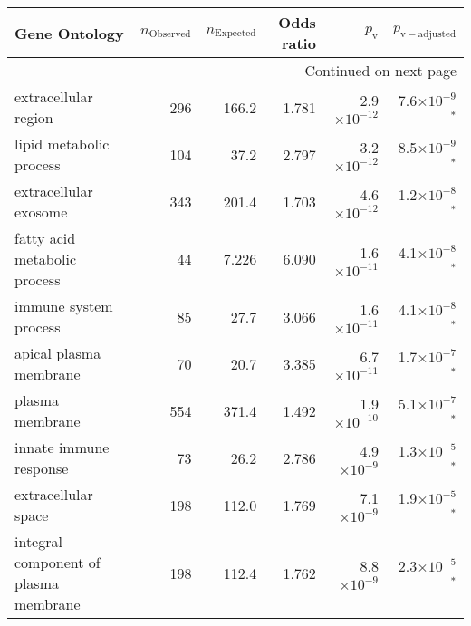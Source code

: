 \begin{longtable}{|l|r|r|r|r|r|}
\toprule
                                     Gene Ontology & $n_{\mathrm{Observed}}$ & $n_{\mathrm{Expected}}$ & Odds ratio &     $p_{\mathrm{v}}$ &     $p_{\mathrm{v-adjusted}}$ \\
\midrule
\endhead
\midrule
\multicolumn{6}{r}{{Continued on next page}} \\
\midrule
\endfoot

\bottomrule
\endlastfoot
                              extracellular region &                     296 &                   166.2 &      1.781 & 2.9$\times 10^{-12}$ &  7.6$\times 10^{-9}$$\bm{^*}$ \\
                           lipid metabolic process &                     104 &                    37.2 &      2.797 & 3.2$\times 10^{-12}$ &  8.5$\times 10^{-9}$$\bm{^*}$ \\
                             extracellular exosome &                     343 &                   201.4 &      1.703 & 4.6$\times 10^{-12}$ &  1.2$\times 10^{-8}$$\bm{^*}$ \\
                      fatty acid metabolic process &                      44 &                   7.226 &      6.090 & 1.6$\times 10^{-11}$ &  4.1$\times 10^{-8}$$\bm{^*}$ \\
                             immune system process &                      85 &                    27.7 &      3.066 & 1.6$\times 10^{-11}$ &  4.1$\times 10^{-8}$$\bm{^*}$ \\
                            apical plasma membrane &                      70 &                    20.7 &      3.385 & 6.7$\times 10^{-11}$ &  1.7$\times 10^{-7}$$\bm{^*}$ \\
                                   plasma membrane &                     554 &                   371.4 &      1.492 & 1.9$\times 10^{-10}$ &  5.1$\times 10^{-7}$$\bm{^*}$ \\
                            innate immune response &                      73 &                    26.2 &      2.786 &  4.9$\times 10^{-9}$ &  1.3$\times 10^{-5}$$\bm{^*}$ \\
                               extracellular space &                     198 &                   112.0 &      1.769 &  7.1$\times 10^{-9}$ &  1.9$\times 10^{-5}$$\bm{^*}$ \\
             integral component of plasma membrane &                     198 &                   112.4 &      1.762 &  8.8$\times 10^{-9}$ &  2.3$\times 10^{-5}$$\bm{^*}$ \\

\end{longtable}
